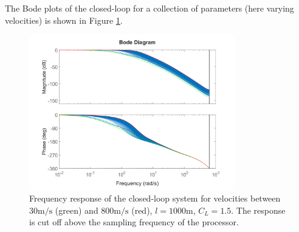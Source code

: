 The Bode plots of the closed-loop for a collection of parameters (here varying velocities) is shown in Figure \ref{fig:controller-bodes}.

\begin{figure}[ht!]
    \centering
    \includegraphics[width=0.8\textwidth]{images-design/controller_bodes.png}
    \caption[Closed-loop frequency response]{Frequency response of the closed-loop system for velocities between $30\mathrm{m/s}$ (green) and $800\mathrm{m/s}$ (red), $l=1000\mathrm{m}$, $C_L = 1.5$.
    The response is cut off above the sampling frequency of the processor.}
    \label{fig:controller-bodes}
\end{figure}


